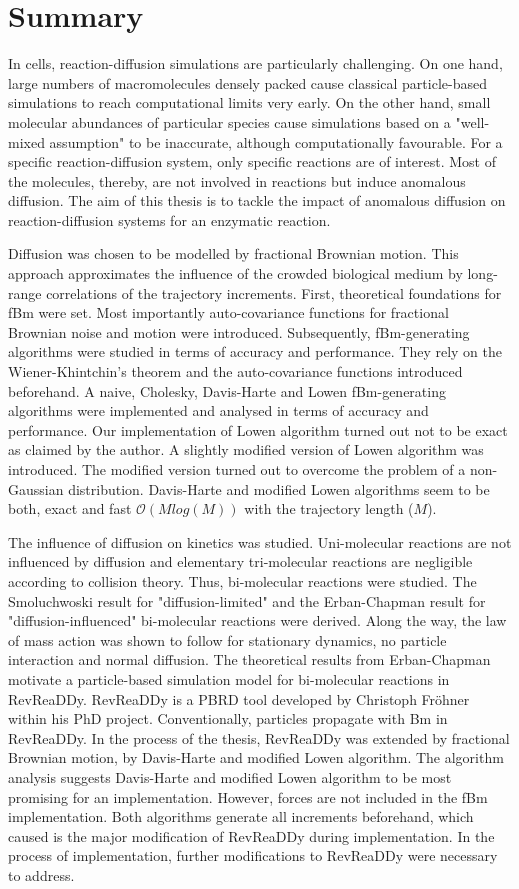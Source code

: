 \documentclass[
  a4paper,BCOR10mm,twoside,
  headsepline,footsepline,%
  fleqn,openbib
]{scrbook}
\begin{document}
\chapter{Summary}
In cells, reaction-diffusion simulations are particularly challenging. On one hand, large numbers of macromolecules densely packed cause classical particle-based simulations to reach computational limits very early.  On the other hand, small molecular abundances of particular species cause simulations based on a "well-mixed assumption" to be inaccurate, although computationally favourable. For a specific reaction-diffusion system, only specific reactions are of interest. Most of the molecules, thereby, are not involved in reactions but induce anomalous diffusion. The aim of this thesis is to tackle the impact of anomalous diffusion on reaction-diffusion systems for an enzymatic reaction. \par
Diffusion was chosen to be modelled by fractional Brownian motion. This approach approximates the influence of the crowded biological medium by long-range correlations of the trajectory increments. First, theoretical foundations for fBm were set. Most importantly auto-covariance functions for fractional Brownian noise and motion were introduced. Subsequently, fBm-generating algorithms were studied in terms of accuracy and performance. They rely on the Wiener-Khintchin's theorem and the auto-covariance functions introduced beforehand. A naive, Cholesky, Davis-Harte and Lowen fBm-generating algorithms were implemented and analysed in terms of accuracy and performance. Our implementation of Lowen algorithm turned out not to be exact as claimed by the author\cite{Lowen1999}. A slightly modified version of Lowen algorithm was introduced. The modified version turned out to overcome the problem of a non-Gaussian distribution. Davis-Harte and modified Lowen algorithms seem to be both, exact and fast $\mathcal{O}(M log(M))$ with the trajectory length ($M$).\par
The influence of diffusion on kinetics was studied. Uni-molecular reactions are not influenced by diffusion and elementary tri-molecular reactions are negligible according to collision theory. Thus, bi-molecular reactions were studied. The Smoluchwoski result for "diffusion-limited" and the Erban-Chapman result for "diffusion-influenced" bi-molecular reactions were derived. Along the way, the law of mass action was shown to follow for stationary dynamics, no particle interaction and normal diffusion. The theoretical results from Erban-Chapman motivate a particle-based simulation model for bi-molecular reactions in RevReaDDy. RevReaDDy is a PBRD tool developed by Christoph Fröhner within his PhD project. Conventionally, particles propagate with Bm in RevReaDDy. In the process of the thesis, RevReaDDy was extended by fractional Brownian motion, by Davis-Harte and modified Lowen algorithm. The algorithm analysis suggests Davis-Harte and modified Lowen algorithm to be most promising for an implementation. However, forces are not included in the fBm implementation. Both algorithms generate all increments beforehand, which caused is the major modification of RevReaDDy during implementation. In the process of implementation, further modifications to RevReaDDy were necessary to address. \par
\end{document}
